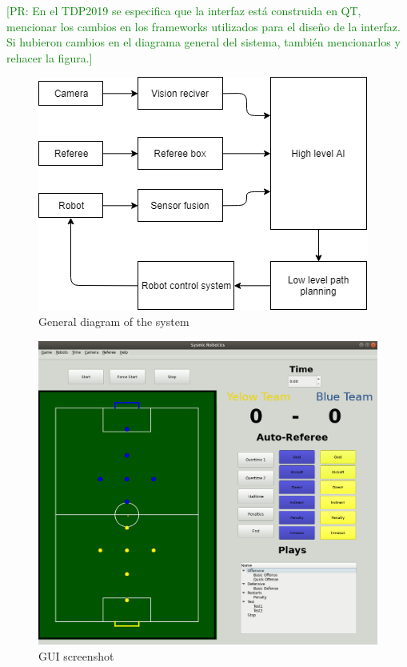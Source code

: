 \documentclass{llncs}
\newcommand{\PR}[1]{{\textcolor{green}{[PR: #1]}}}  %
\begin{document}
\PR{En el TDP2019 se especifica que la interfaz está construida en QT, mencionar los cambios en los frameworks utilizados para el diseño de la interfaz. Si hubieron cambios en el diagrama general del sistema, también mencionarlos y rehacer la figura.}

\begin{figure}[H]
    \centering
    \includegraphics[scale=0.5]{gDiagram.png}
    \caption{General diagram of the system}
    \label{fig:gDiagram}
\end{figure}

\begin{figure}[h]
    \centering
    \includegraphics[scale=0.4]{GUI_F.png}
    \caption{GUI screenshot}
    \label{fig:GUI}
\end{figure}
\end{document}
